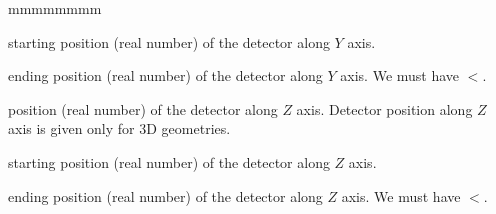 \begin{ListeDeDescription}{mmmmmmmm}
\item[\dusa{valy1}] starting position (real number) of the detector along $Y$ axis.

\item[\dusa{valy2}] ending position (real number) of the detector along $Y$ axis. We must have $<$.
 
\item[\dusa{valz}] position (real number) of the detector along $Z$ axis. Detector position along $Z$ axis is given only for 3D geometries.

\item[\dusa{valz1}] starting position (real number) of the detector along $Z$ axis.

\item[\dusa{valz2}] ending position (real number) of the detector along $Z$ axis. We must have $<$.

\end{ListeDeDescription}
\clearpage
